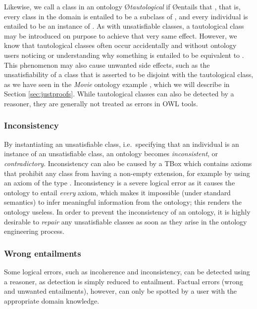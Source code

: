 Likewise, we call a class  in an ontology \O \emph{tautological} if \O entails that , that is, every class in the domain is entailed to be a subclass of , and every individual is entailed to be an instance of . As with unsatisfiable classes, a tautological class may be introduced on purpose to achieve that very same effect. However, we know that tautological classes often occur accidentally and without ontology users noticing or understanding why something is entailed to be equivalent to \thing \cite{horridge09ct}. This phenomenon may also cause unwanted side effects, such as the unsatisfiability of a class that is asserted to be disjoint with the tautological class, as we have seen in the \emph{Movie} ontology example \cite{horridge09ct}, which we will describe in Section \ref{sec:justproofs}. While tautological classes can also be detected by a reasoner, they are generally not treated as errors in OWL tools.


\subsubsection{Inconsistency}
By instantiating an unsatisfiable class, i.e.\ specifying that an individual is an instance of an unsatisfiable class, an ontology becomes \emph{inconsistent}, or \emph{contradictory}. Inconsistency can also be caused by a TBox which contains axioms that prohibit any class from having a non-empty extension, for example by using an axiom of the type . Inconsistency is a severe logical error as it causes the ontology to entail \emph{every} axiom, which makes it impossible (under standard semantics) to infer meaningful information from the ontology; this renders the ontology useless. In order to prevent the inconsistency of an ontology, it is highly desirable to \emph{repair} any unsatisfiable classes as soon as they arise in the ontology engineering process.


\subsubsection{Wrong entailments}

Some logical errors, such as incoherence and inconsistency, can be detected using a reasoner, as detection is simply reduced to entailment. Factual errors (wrong and unwanted entailments), however, can only be spotted by a user with the appropriate domain knowledge.


